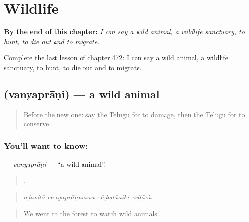 
\chapter{Wildlife}
\label{ch:te-wildlife}

\begin{chapteropening}
\textbf{By the end of this chapter:} \emph{I can say a wild animal, a wildlife sanctuary, to hunt, to die out and to migrate.}

Complete the last lesson of chapter 472: I can say a wild animal, a wildlife sanctuary, to hunt, to die out and to migrate.
\end{chapteropening}

\section[\texorpdfstring{\te{వన్యప్రాణి} (vanyaprāṇi)}{వన్యప్రాణి (vanyaprāṇi)}]{ (vanyaprāṇi) — a wild animal}

\label{lesson:TE-C472-vanyaprani}



\begin{quote}
Before the new one: say the Telugu for to damage, then the Telugu for to conserve.
\end{quote}

\subsection*{You'll want to know: }
\textbf{} — \emph{vanyaprāṇi} — \textquotedblleft{}a wild animal\textquotedblright{}.

\begin{quote}
   .
\end{quote}

\begin{quote}
\emph{aḍavilō vanyaprāṇulanu cūḍaḍāniki veḷḷāṁ.}
\end{quote}

\begin{quote}
We went to the forest to watch wild animals.
\end{quote}

